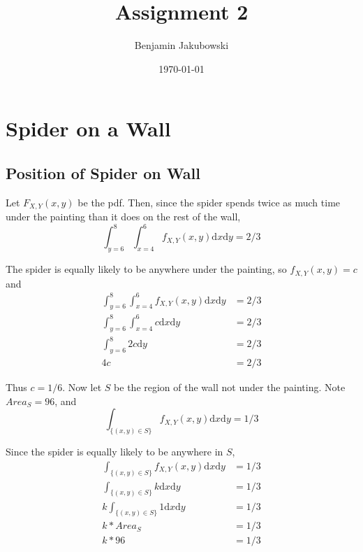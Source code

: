 \documentclass[paper=a4, fontsize=11pt]{scrartcl} %
\title{	Assignment 2}
\author{Benjamin Jakubowski} %
\date{\normalsize\today} %
\numberwithin{equation}{section} %
\numberwithin{figure}{section} %
\numberwithin{table}{section} %
\begin{document}
\maketitle %


\section{Spider on a Wall}

\subsection{Position of Spider on Wall}

Let $F_{X, Y}(x,y)$ be the pdf. Then, since the spider spends twice as much time under the painting than it does on the rest of the wall,
\begin{equation*}
\int_{y=6}^8\int_{x=4}^6{f_{X, Y}(x,y) \textrm{d}x \textrm{d}y} = 2/3
\end{equation*}

The spider is equally likely to be anywhere under the painting, so $f_{X, Y}(x,y) = c$ and
\begin{align*}
\int_{y=6}^8\int_{x=4}^6{f_{X, Y}(x,y) \textrm{d}x \textrm{d}y} &= 2/3 \\
\int_{y=6}^8\int_{x=4}^6{c \textrm{d}x \textrm{d}y} &= 2/3 \\
\int_{y=6}^8{2c \textrm{d}y} &= 2/3 \\
4c &= 2/3
\end{align*}

Thus $c = 1/6$. Now let $S$ be the region of the wall not under the painting. Note $Area_{S} = 96$, and 
\begin{equation*}
\int_{\{(x,y) \in S\}}f_{X, Y}(x,y) \textrm{d}x \textrm{d}y =1/3
\end{equation*}

Since the spider is equally likely to be anywhere in $S$, 
\begin{align*}
\int_{\{(x,y) \in S\}}f_{X, Y}(x,y) \textrm{d}x \textrm{d}y &=1/3 \\
\int_{\{(x,y) \in S\}}k \textrm{d}x \textrm{d} y &=1/3 \\
k \int_{\{(x,y) \in S\}}1 \textrm{d}x \textrm{d} y &=1/3 \\
k * Area_{S} &= 1/3 \\
k * 96 &= 1/3
\end{align*}
\end{document}
